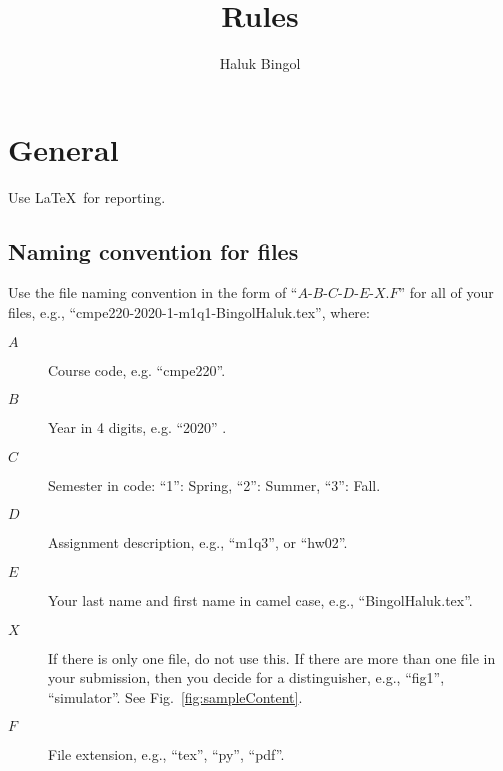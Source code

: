 \documentclass[11pt,a4,twocolumn]{article}
\title{
	Rules
}
\author{Haluk Bingol}
\date{\hbTimeStamp}
\newcommand{\reffig}[1]{Fig.~\ref{#1}}
\theoremstyle{plain}
\theoremstyle{definition}
\theoremstyle{remark}
\begin{document}
\maketitle








\section{General}

Use \LaTeX\ for reporting.




\subsection{Naming convention for files}

Use the file naming convention in the form of ``$A$-$B$-$C$-$D$-$E$-$X$.$F$'' for all of your files,
e.g., ``cmpe220-2020-1-m1q1-BingolHaluk.tex'',
where:
\begin{description}
	
	\item[$A$]
	Course code, 
	e.g. ``cmpe220''.
	
	\item[$B$]
	Year in 4 digits, 
	e.g. ``2020'' .
	
	\item[$C$] 
	Semester in code: ``1'': Spring, ``2'': Summer, ``3'': Fall.
	
	\item[$D$] 
	Assignment description, 
	e.g., ``m1q3'', or ``hw02''.
	
	\item[$E$]
	Your last name and first name in camel case,
	e.g., ``BingolHaluk.tex''.
	
	\item[$X$]
	If there is only one file, do not use this.
	If there are more than one file in your submission, 
	then you decide for a distinguisher,
	e.g., ``fig1'', ``simulator''.
	See \reffig{fig:sampleContent}.
	
	\item[$F$]
	File extension, 
	e.g., ``tex'', ``py'', ``pdf''.
\end{description}
\end{document}
